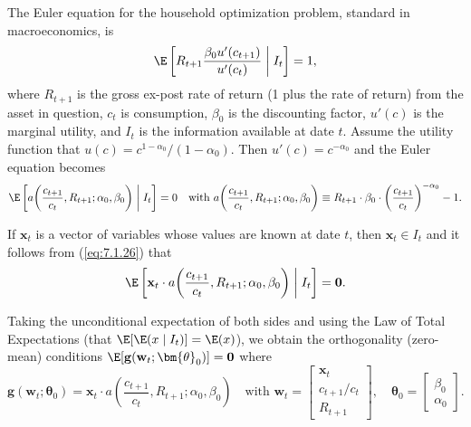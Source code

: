 \begin{example}
\label{ex:7.5}
The Euler equation for the household optimization problem, standard in macroeconomics, is
\begin{equation}
\label{eq:7.1.25}
\E\left[ R_{t+1} \frac{\beta_0 u'(c_{t+1})}{u'(c_t)} \;\middle|\; I_t \right] = 1,
\end{equation}
where $R_{t+1}$ is the gross ex-post rate of return (1 plus the rate of return) from the asset in question, $c_t$ is consumption, $\beta_0$ is the discounting factor, $u'(c)$ is the marginal utility, and $I_t$ is the information available at date $t$. Assume the utility function that $u(c) = c^{1-\alpha_0}/(1 - \alpha_0)$. Then $u'(c) = c^{-\alpha_0}$ and the Euler equation becomes
\begin{equation}
\label{eq:7.1.26}
\E\left[ a\!\left(\frac{c_{t+1}}{c_t}, R_{t+1}; \alpha_0, \beta_0\right) \;\middle|\; I_t \right] = 0 \quad \text{with } a\!\left(\frac{c_{t+1}}{c_t}, R_{t+1}; \alpha_0, \beta_0\right) \equiv R_{t+1} \cdot \beta_0 \cdot \left(\frac{c_{t+1}}{c_t}\right)^{-\alpha_0} - 1.
\end{equation}

If $\mathbf{x}_t$ is a vector of variables whose values are known at date $t$, then $\mathbf{x}_t \in I_t$ and it follows from (\ref{eq:7.1.26}) that
\begin{equation}
\label{eq:7.1.27}
\E\left[ \mathbf{x}_t \cdot a\!\left(\frac{c_{t+1}}{c_t}, R_{t+1}; \alpha_0, \beta_0\right) \;\middle|\; I_t \right] = \mathbf{0}.
\end{equation}

Taking the unconditional expectation of both sides and using the Law of Total Expectations (that $\E[\E(x \mid I_t)] = \E(x)$), we obtain the orthogonality (zero-mean) conditions $\E[\mathbf{g}(\mathbf{w}_t; \bm{\theta}_0)] = \mathbf{0}$ where
\begin{equation}
\label{eq:7.1.28}
\mathbf{g}(\mathbf{w}_t; \bm{\theta}_0) = \mathbf{x}_t \cdot a\!\left(\frac{c_{t+1}}{c_t}, R_{t+1}; \alpha_0, \beta_0\right) \quad \text{with } \mathbf{w}_t = \begin{bmatrix} \mathbf{x}_t \\ c_{t+1}/c_t \\ R_{t+1} \end{bmatrix}, \quad \bm{\theta}_0 = \begin{bmatrix} \beta_0 \\ \alpha_0 \end{bmatrix}.
\end{equation}
\end{example}

